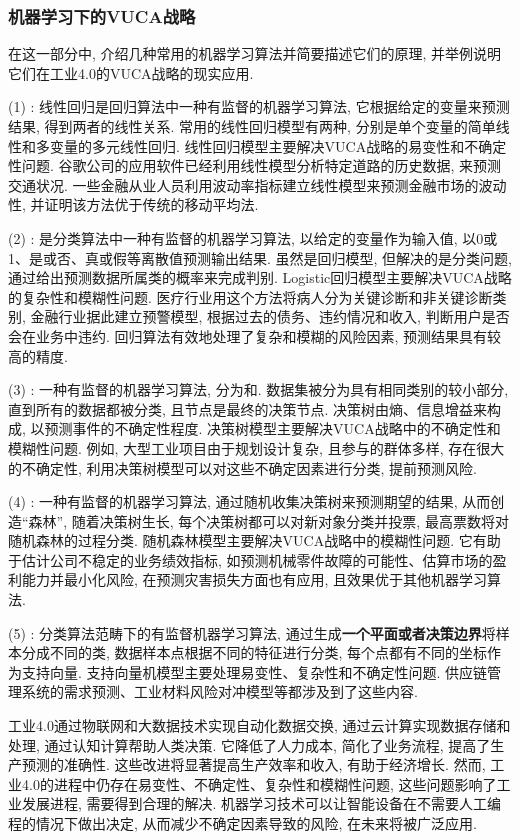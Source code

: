 \subsubsection{机器学习下的VUCA战略}
在这一部分中, 介绍几种常用的机器学习算法并简要描述它们的原理, 并举例说明它们在工业4.0的VUCA战略的现实应用.

(1) : 线性回归是回归算法中一种有监督的机器学习算法, 它根据给定的变量来预测结果, 得到两者的线性关系. 常用的线性回归模型有两种, 分别是单个变量的简单线性和多变量的多元线性回归.
线性回归模型主要解决VUCA战略的易变性和不确定性问题. 谷歌公司的应用软件已经利用线性模型分析特定道路的历史数据, 来预测交通状况. 一些金融从业人员利用波动率指标建立线性模型来预测金融市场的波动性, 并证明该方法优于传统的移动平均法.

(2) : 是分类算法中一种有监督的机器学习算法, 以给定的变量作为输入值, 以0或1、是或否、真或假等离散值预测输出结果. 虽然是回归模型, 但解决的是分类问题, 通过给出预测数据所属类的概率来完成判别.
Logistic回归模型主要解决VUCA战略的复杂性和模糊性问题. 医疗行业用这个方法将病人分为关键诊断和非关键诊断类别, 金融行业据此建立预警模型, 根据过去的债务、违约情况和收入, 判断用户是否会在业务中违约. 回归算法有效地处理了复杂和模糊的风险因素, 预测结果具有较高的精度.

(3) : 一种有监督的机器学习算法, 分为和. 数据集被分为具有相同类别的较小部分, 直到所有的数据都被分类, 且节点是最终的决策节点. 决策树由熵、信息增益来构成, 以预测事件的不确定性程度.
决策树模型主要解决VUCA战略中的不确定性和模糊性问题. 例如, 大型工业项目由于规划设计复杂, 且参与的群体多样, 存在很大的不确定性, 利用决策树模型可以对这些不确定因素进行分类, 提前预测风险.

(4) : 一种有监督的机器学习算法, 通过随机收集决策树来预测期望的结果, 从而创造“森林”, 随着决策树生长, 每个决策树都可以对新对象分类并投票, 最高票数将对随机森林的过程分类.
随机森林模型主要解决VUCA战略中的模糊性问题. 它有助于估计公司不稳定的业务绩效指标, 如预测机械零件故障的可能性、估算市场的盈利能力并最小化风险, 在预测灾害损失方面也有应用, 且效果优于其他机器学习算法.

(5) : 分类算法范畴下的有监督机器学习算法, 通过生成\textbf{一个平面或者决策边界}将样本分成不同的类, 数据样本点根据不同的特征进行分类, 每个点都有不同的坐标作为支持向量.
支持向量机模型主要处理易变性、复杂性和不确定性问题. 供应链管理系统的需求预测、工业材料风险对冲模型等都涉及到了这些内容.

工业4.0通过物联网和大数据技术实现自动化数据交换, 通过云计算实现数据存储和处理, 通过认知计算帮助人类决策. 它降低了人力成本, 简化了业务流程, 提高了生产预测的准确性. 这些改进将显著提高生产效率和收入, 有助于经济增长.
然而, 工业4.0的进程中仍存在易变性、不确定性、复杂性和模糊性问题, 这些问题影响了工业发展进程, 需要得到合理的解决. 机器学习技术可以让智能设备在不需要人工编程的情况下做出决定, 从而减少不确定因素导致的风险, 在未来将被广泛应用.
